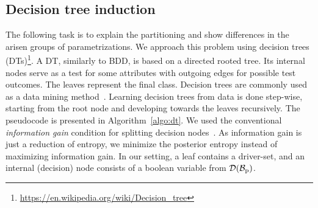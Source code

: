 \documentclass[
	digital, oneside, nosansbold, nocolorbold, nolot, nolof
]{fithesis4}
\theoremstyle{definition}
\theoremstyle{definition}
\begin{document}
\subsection{Decision tree induction}

The following task is to explain the partitioning and show differences in the
arisen groups of parametrizations. We approach this problem using decision
trees (DTs)\footnote{\url{https://en.wikipedia.org/wiki/Decision_tree}}. A DT,
similarly to BDD, is based on a directed rooted tree. Its internal nodes serve
as a test for some attributes with outgoing edges for possible test outcomes.
The leaves represent the final class. Decision trees are commonly used as a
data mining method~\cite{data_mining}. Learning decision trees from data is
done step-wise, starting from the root node and developing towards the leaves
recursively. The pseudocode is presented in Algorithm~\ref{algo:dt}. We used
the conventional \emph{information gain} condition for splitting decision
nodes~\cite{decision_trees}. As information gain is just a reduction of
entropy, we minimize the posterior entropy instead of maximizing information
gain. In our setting, a leaf contains a driver-set, and an internal (decision)
node consists of a boolean variable from $\mathcal{D}(\mathcal{B}_{\text{p}})$.
\end{document}
